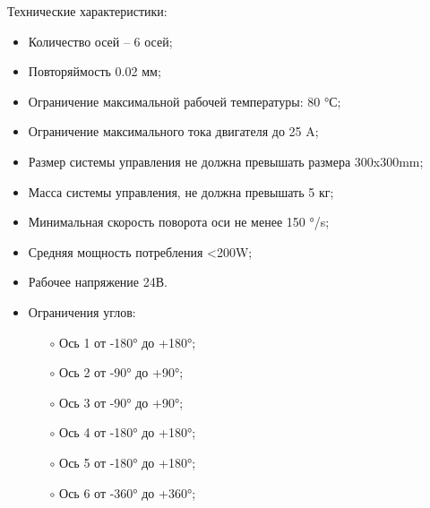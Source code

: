 Технические характеристики:
\begin{itemize}
	\item Количество осей – 6 осей;
	\item Повторяймость 0.02 мм;
	\item Ограничение максимальной рабочей температуры: 80 °С;
	\item Ограничение максимального тока двигателя до 25 A;
	\item Размер системы управления не должна превышать размера 300x300mm;
	\item Масса системы управления, не должна превышать 5 кг;
	\item Минимальная скорость поворота оси не менее 150 °/s;
	\item Средняя мощность потребления <200W;
	\item Рабочее напряжение 24В.
	\item Ограничения углов:
	\begin{itemize}
		\item[$\circ$] Ось 1 от -180° до +180°;
		\item[$\circ$] Ось 2 от -90° до +90°;
		\item[$\circ$] Ось 3 от -90° до +90°;
		\item[$\circ$] Ось 4 от -180° до +180°;
		\item[$\circ$] Ось 5 от -180° до +180°;
		\item[$\circ$] Ось 6 от -360° до +360°;
	\end{itemize}

\end{itemize}

